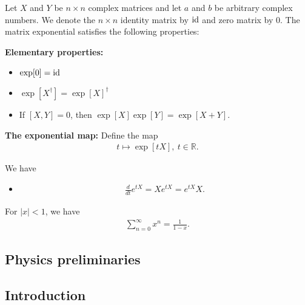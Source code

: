 \documentclass[../../note.tex]{subfiles}
\begin{document}
\begin{lemma}
    \label{lemma: properties of matrix exponential}
    Let $X$ and $Y$ be $n \times n$ complex matrices and let $a$ and $b$ be arbitrary complex numbers. We denote the $n \times n$ identity matrix by $\operatorname{id}$ and zero matrix by $0$. The matrix exponential satisfies the following properties:

    \textbf{Elementary properties:}
    \begin{itemize}
        \item $\exp[0] = \operatorname{id}$ \\
        \item $\exp[X^\dagger] = \exp[X]^\dagger$ \\
        \item If $[X, Y] = 0$, then $\exp[X] \exp[Y] = \exp[X + Y]$.
    \end{itemize}

    \textbf{The exponential map:}
    Define the map 
    \begin{align}
        t \mapsto \exp[t X],~ t \in \mathbb{R}.
    \end{align}

    We have
    \begin{itemize}
        \item \begin{align}
            \frac{d}{d t} e^{t X} = X e^{t X} = e^{t X} X.
        \end{align}
    \end{itemize}
\end{lemma}

\begin{lemma}
    For $\vert x \vert < 1$, we have
    \begin{align}
        \sum_{n=0}^{\infty} x^n = \frac{1}{1 - x}.
    \end{align}
\end{lemma}

\begin{lemma}
    
\end{lemma}


\subsection{Physics preliminaries}


\subsection{Introduction}
\end{document}
